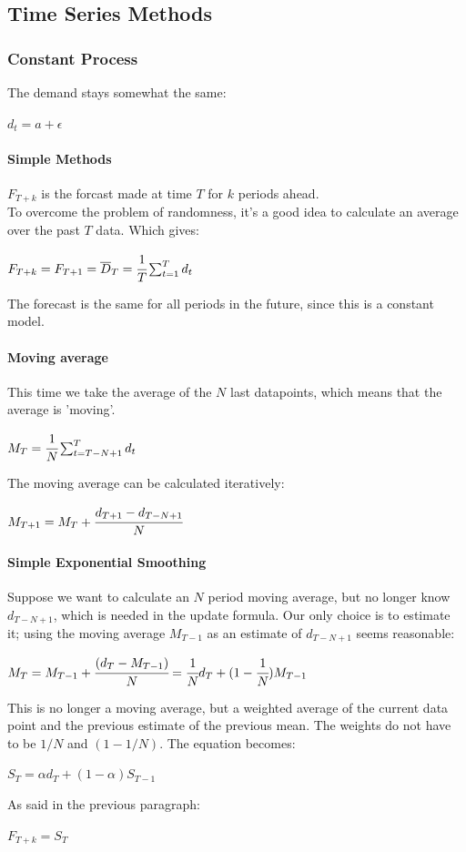 \documentclass[12pt]{article}
\begin{document}
\subsection{Time Series Methods}
\subsubsection{Constant Process}
The demand stays somewhat the same:
\begin{center}
$d_t = a + \epsilon$
\end{center}
\paragraph{Simple Methods}
$F_{T+k}$ is the forcast made at time $T$ for $k$ periods ahead.\\
To overcome the problem of randomness, it's a good idea to calculate an average over the past $T$ data. Which gives:
\begin{center}
$F_{T + k} = F_{T + 1} = \overline{D}_T = \cfrac{1}{T}\sum_{t = 1}^Td_t$
\end{center}
The forecast is the same for all periods in the future, since this is a constant model.
\paragraph{Moving average} This time we take the average of the $N$ last datapoints, which means that the average is 'moving'.
\begin{center}
$M_T = \cfrac{1}{N}\sum_{t = T-N+1}^{T}d_t$
\end{center}
The moving average can be calculated iteratively:
\begin{center}
$M_{T+1} = M_T + \cfrac{d_{T+1}-d_{T-N+1}}{N}$
\end{center}
\paragraph{Simple Exponential Smoothing} Suppose we want to calculate an $N$ period moving average, but no longer know $d_{T-N+1}$, which is needed in the update formula. Our only choice is to estimate it; using the moving average $M_{T-1}$ as an estimate of $d_{T-N+1}$ seems reasonable:
\begin{center}
$M_T = M_{T-1} + \cfrac{(d_T - M_{T-1})}{N} = \cfrac{1}{N}d_T + (1 - \cfrac{1}{N})M_{T-1}$
\end{center}
This is no longer a moving average, but a weighted average of the current data point and the previous estimate of the previous mean. The weights do not have to be $1/N$ and $(1-1/N)$. The equation becomes:
\begin{center}
$S_T = \alpha d_T + (1 - \alpha)S_{T-1}$
\end{center}
As said in the previous paragraph:
\begin{center}
$F_{T+k} = S_T$
\end{center}
\end{document}
